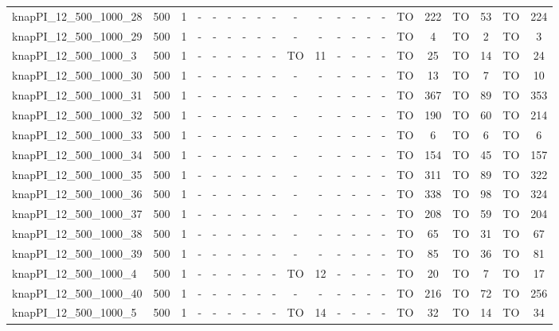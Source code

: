 \begin{sidewaystable}[!ht]
{\begin{tabular}{lcccccccccccccccccccc}
knapPI\_12\_500\_1000\_28 & 500 & 1 &  - &  - &  - &  - &  - &  - &  - &  - &  - &  - &  - &  - & TO & 222 & TO & 53 & TO & 224 \\
knapPI\_12\_500\_1000\_29 & 500 & 1 &  - &  - &  - &  - &  - &  - &  - &  - &  - &  - &  - &  - & TO & 4 & TO & 2 & TO & 3 \\
knapPI\_12\_500\_1000\_3 & 500 & 1 &  - &  - &  - &  - &  - &  - & TO & 11 &  - &  - &  - &  - & TO & 25 & TO & 14 & TO & 24 \\
knapPI\_12\_500\_1000\_30 & 500 & 1 &  - &  - &  - &  - &  - &  - &  - &  - &  - &  - &  - &  - & TO & 13 & TO & 7 & TO & 10 \\
knapPI\_12\_500\_1000\_31 & 500 & 1 &  - &  - &  - &  - &  - &  - &  - &  - &  - &  - &  - &  - & TO & 367 & TO & 89 & TO & 353 \\
knapPI\_12\_500\_1000\_32 & 500 & 1 &  - &  - &  - &  - &  - &  - &  - &  - &  - &  - &  - &  - & TO & 190 & TO & 60 & TO & 214 \\
knapPI\_12\_500\_1000\_33 & 500 & 1 &  - &  - &  - &  - &  - &  - &  - &  - &  - &  - &  - &  - & TO & 6 & TO & 6 & TO & 6 \\
knapPI\_12\_500\_1000\_34 & 500 & 1 &  - &  - &  - &  - &  - &  - &  - &  - &  - &  - &  - &  - & TO & 154 & TO & 45 & TO & 157 \\
knapPI\_12\_500\_1000\_35 & 500 & 1 &  - &  - &  - &  - &  - &  - &  - &  - &  - &  - &  - &  - & TO & 311 & TO & 89 & TO & 322 \\
knapPI\_12\_500\_1000\_36 & 500 & 1 &  - &  - &  - &  - &  - &  - &  - &  - &  - &  - &  - &  - & TO & 338 & TO & 98 & TO & 324 \\
knapPI\_12\_500\_1000\_37 & 500 & 1 &  - &  - &  - &  - &  - &  - &  - &  - &  - &  - &  - &  - & TO & 208 & TO & 59 & TO & 204 \\
knapPI\_12\_500\_1000\_38 & 500 & 1 &  - &  - &  - &  - &  - &  - &  - &  - &  - &  - &  - &  - & TO & 65 & TO & 31 & TO & 67 \\
knapPI\_12\_500\_1000\_39 & 500 & 1 &  - &  - &  - &  - &  - &  - &  - &  - &  - &  - &  - &  - & TO & 85 & TO & 36 & TO & 81 \\
knapPI\_12\_500\_1000\_4 & 500 & 1 &  - &  - &  - &  - &  - &  - & TO & 12 &  - &  - &  - &  - & TO & 20 & TO & 7 & TO & 17 \\
knapPI\_12\_500\_1000\_40 & 500 & 1 &  - &  - &  - &  - &  - &  - &  - &  - &  - &  - &  - &  - & TO & 216 & TO & 72 & TO & 256 \\
knapPI\_12\_500\_1000\_5 & 500 & 1 &  - &  - &  - &  - &  - &  - & TO & 14 &  - &  - &  - &  - & TO & 32 & TO & 14 & TO & 34 \\

\end{tabular}}
\end{sidewaystable}
